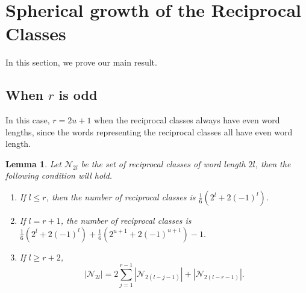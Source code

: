 \documentclass[11pt]{amsart}
\numberwithin{equation}{section}
\newtheorem{lemma}[theorem]{Lemma}
\theoremstyle{definition}
\newcommand{\g}{\gamma_{p}}
\newcommand{\io}{\iota }
\numberwithin{equation}{section}
\begin{document}
		\section{Spherical growth  of the Reciprocal Classes}\label{4}
		In this section, we prove our main result. 
		\subsection{When $r$ is odd }
		In this case, $r=2u+1$ when the reciprocal classes always have even word lengths, since the words representing the reciprocal classes all have even word length. 
		
		\begin{lemma}\label{count}
			Let $\mathcal{N}_{2l}$ be the set of reciprocal classes of word length $2l$, then the following condition will hold.
			\begin{enumerate}
				\item If $l\leq r$, then the number of reciprocal classes is $ \frac{1}{6}(2^{l}+2(-1)^{l})$.
				\item If $l=r+1$, the number of reciprocal classes is $\frac{1}{6}(2^{l}+2(-1)^{l})+\frac{ 1}{6}(2^{u+1}+2(-1)^{u+1})-1.$
				\item If $l\geq r+2$, 
				\[|\mathcal{N}_{2l}|=2\sum_{j=1}^{r-1}|\mathcal{N}_{2(l-j-1)}|+|\mathcal{N}_{2(l-r-1)}|.\]
			\end{enumerate} 
		\end{lemma}
\end{document}
